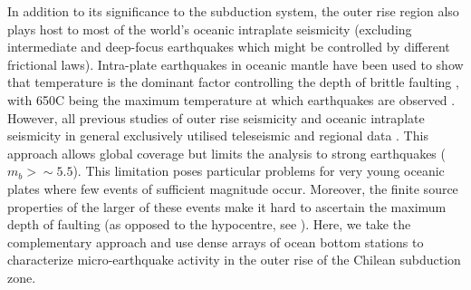 \documentclass[reviewcopy]{elsart}
\begin{document}
In addition to
its significance to the subduction system, the outer rise region also
plays host to most of the world's oceanic intraplate  seismicity
(excluding intermediate and deep-focus earthquakes which might be
controlled by different frictional laws).  
Intra-plate earthquakes in oceanic mantle have been used to show that
temperature is the dominant factor controlling the
depth of brittle faulting \citep{wiens83}, with 650\dg C being the
maximum temperature at which earthquakes are observed
\citep{mckenzie05}.
However, all previous studies of outer rise seismicity and oceanic
intraplate seismicity in general exclusively utilised teleseismic and
regional data \citep[e.g.][]{wiens83,christensen88}. This approach allows global
  coverage but limits the analysis to strong earthquakes ($m_b>\sim
  5.5$). This limitation poses particular problems for very young
  oceanic plates where few events of sufficient magnitude
  occur.   %
Moreover, the finite source properties of the larger of these events
make it hard to ascertain the maximum depth of faulting (as opposed to
the hypocentre, see \citet{tichelaar92}).
Here, we take the complementary approach and use dense arrays of
ocean bottom stations to characterize micro-earthquake activity in the
outer rise of the Chilean subduction zone.
\end{document}
